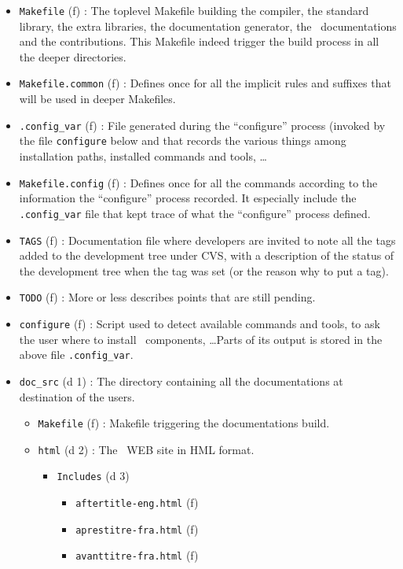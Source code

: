 \begin{itemize}
\item {\tt Makefile} (f) : The toplevel Makefile building the
  compiler, the standard library, the extra libraries, the
  documentation generator, the \focalize\ documentations and the
  contributions. This Makefile indeed trigger the build process in all
  the deeper directories.
\item {\tt Makefile.common} (f) : Defines once for all the implicit
  rules and suffixes that will be used in deeper Makefiles.
\item {\tt .config\_var} (f) : File generated during the ``configure''
  process (invoked by the file {\tt configure} below and that records
  the various things among installation paths, installed commands and
  tools, \ldots
\item {\tt Makefile.config} (f) : Defines once for all the commands
  according to the information the ``configure'' process recorded. It
  especially include the {\tt .config\_var} file that kept trace of what
  the ``configure'' process defined.
\item {\tt TAGS} (f) : Documentation file where developers are
  invited to note all the tags added to the development tree under CVS,
  with a description of the status of the development tree when the
  tag was set (or the reason why to put a tag).
\item {\tt TODO} (f) : More or less describes points that are still
  pending.
\item {\tt configure} (f) : Script used to detect available commands
  and tools, to ask the user where to install \focalize\ components,
  \ldots Parts of its output is stored in the above file
  {\tt .config\_var}.
\item {\tt doc\_src} (d 1) : The directory containing all the
  documentations at destination of the users.
  \begin{itemize}
  \item {\tt Makefile} (f) : Makefile triggering the documentations
    build.
  \item {\tt html} (d 2) : The \focalize\ WEB site in HML format.
    \begin{itemize}
    \item {\tt Includes} (d 3)
      \begin{itemize}
      \item {\tt aftertitle-eng.html} (f)
      \item {\tt aprestitre-fra.html} (f)
      \item {\tt avanttitre-fra.html} (f)

\end{itemize}
\end{itemize}
\end{itemize}
\end{itemize}
